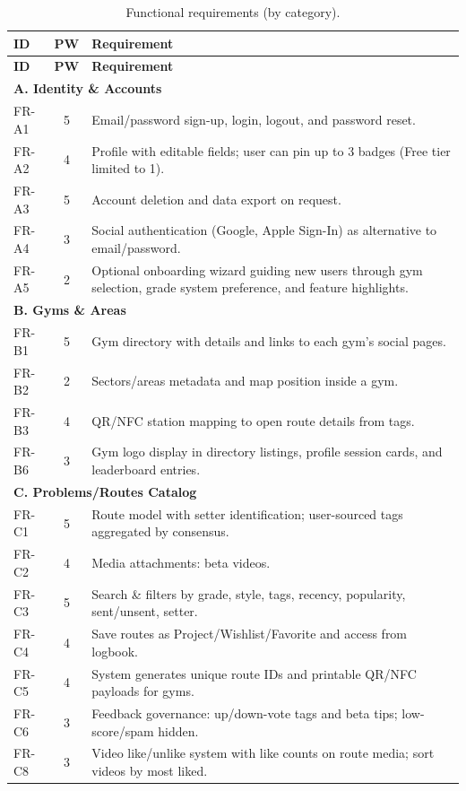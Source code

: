 \documentclass[12pt,a4paper]{report}
\renewcommand\_{\textunderscore\hspace{0pt}}
\begin{document}
\renewcommand{\arraystretch}{1.2}
\small
\begin{longtable}{l c >{\raggedright\arraybackslash}p{11cm}}
\caption{Functional requirements (by category).}\label{tab:functional-requirements}\\
\hline
\textbf{ID} & \textbf{PW} & \textbf{Requirement} \\
\hline
\endfirsthead

\hline
\textbf{ID} & \textbf{PW} & \textbf{Requirement} \\
\hline
\endhead

\multicolumn{3}{l}{\textbf{A. Identity \& Accounts}} \\
\hline
FR-A1 & 5 & Email/password sign-up, login, logout, and password reset. \\
FR-A2 & 4 & Profile with editable fields; user can pin up to 3 badges (Free tier limited to 1). \\
FR-A3 & 5 & Account deletion and data export on request. \\
FR-A4 & 3 & Social authentication (Google, Apple Sign-In) as alternative to email/password. \\
FR-A5 & 2 & Optional onboarding wizard guiding new users through gym selection, grade system preference, and feature highlights. \\

\hline
\multicolumn{3}{l}{\textbf{B. Gyms \& Areas}} \\
\hline
FR-B1 & 5 & Gym directory with details and links to each gym's social pages. \\
FR-B2 & 2 & Sectors/areas metadata and map position inside a gym. \\
FR-B3 & 4 & QR/NFC station mapping to open route details from tags. \\
FR-B6 & 3 & Gym logo display in directory listings, profile session cards, and leaderboard entries. \\

\hline
\multicolumn{3}{l}{\textbf{C. Problems/Routes Catalog}} \\
\hline
FR-C1 & 5 & Route model with setter identification; user-sourced tags aggregated by consensus. \\
FR-C2 & 4 & Media attachments: beta videos. \\
FR-C3 & 5 & Search \& filters by grade, style, tags, recency, popularity, sent/unsent, setter. \\
FR-C4 & 4 & Save routes as Project/Wishlist/Favorite and access from logbook. \\
FR-C5 & 4 & System generates unique route IDs and printable QR/NFC payloads for gyms. \\
FR-C6 & 3 & Feedback governance: up/down-vote tags and beta tips; low-score/spam hidden. \\
FR-C8 & 3 & Video like/unlike system with like counts on route media; sort videos by most liked. \\


\end{longtable}
\end{document}
